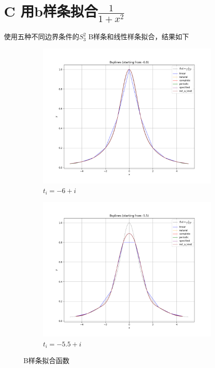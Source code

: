 \documentclass[UTF8]{ctexart}
\begin{document}
	
	\section{C 用b样条拟合$\frac{1}{1+x^2}$}
	使用五种不同边界条件的$S_3^2$ B样条和线性样条拟合，结果如下
	\begin{figure}[H]
		\centering
		\begin{subfigure}[b]{0.45\textwidth}
			\centering
			\includegraphics[width=\textwidth]{../figure/C_1.png}
			\caption{$t_i=-6+i$}
			\label{fig:image1}
		\end{subfigure}
		\hspace{0.5cm}  %
		\begin{subfigure}[b]{0.45\textwidth}
			\centering
			\includegraphics[width=\textwidth]{../figure/C_2.png}
			\caption{$t_i=-5.5+i$}
			\label{fig:image2}
		\end{subfigure}
		\caption{B样条拟合函数}
		\label{fig:two_images}
	\end{figure}
\end{document}
